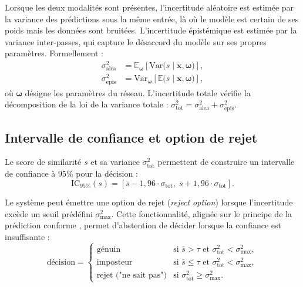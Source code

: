 \documentclass[12pt,a4paper]{report}
\begin{document}
Lorsque les deux modalit\'{e}s sont pr\'{e}sentes, l'incertitude al\'{e}atoire est estim\'{e}e par la variance des pr\'{e}dictions sous la m\^{e}me entr\'{e}e, l\`{a} o\`{u} le mod\`{e}le est certain de ses poids mais les donn\'{e}es sont bruit\'{e}es. L'incertitude \'{e}pist\'{e}mique est estim\'{e}e par la variance inter-passes, qui capture le d\'{e}saccord du mod\`{e}le sur ses propres param\`{e}tres. Formellement :
\begin{align}
\label{eq:decomposition-aleatoric}
\sigma^2_{\text{alea}} &= \mathbb{E}_{\mathbf{\omega}}\left[\text{Var}\bigl(s \mid \mathbf{x}, \mathbf{\omega}\bigr)\right], \\
\label{eq:decomposition-epistemic}
\sigma^2_{\text{epis}} &= \text{Var}_{\mathbf{\omega}}\left[\mathbb{E}\bigl(s \mid \mathbf{x}, \mathbf{\omega}\bigr)\right],
\end{align}
o\`{u} $\mathbf{\omega}$ d\'{e}signe les param\`{e}tres du r\'{e}seau. L'incertitude totale v\'{e}rifie la d\'{e}composition de la loi de la variance totale : $\sigma^2_{\text{tot}} = \sigma^2_{\text{alea}} + \sigma^2_{\text{epis}}$.

\subsection{Intervalle de confiance et option de rejet}

Le score de similarit\'{e} $s$ et sa variance $\sigma^2_{\text{tot}}$ permettent de construire un intervalle de confiance \`{a} $95\%$ pour la d\'{e}cision :
\begin{equation}
\label{eq:intervalle-confiance}
\text{IC}_{95\%}(s) = \left[ \bar{s} - 1{,}96 \cdot \sigma_{\text{tot}}, \; \bar{s} + 1{,}96 \cdot \sigma_{\text{tot}} \right].
\end{equation}

Le syst\`{e}me peut \'{e}mettre une option de rejet (\emph{reject option}) lorsque l'incertitude exc\`{e}de un seuil pr\'{e}d\'{e}fini $\sigma^2_{\max}$. Cette fonctionnalit\'{e}, align\'{e}e sur le principe de la pr\'{e}diction conforme \cite{balomenos2018conformal}, permet d'abstention de d\'{e}cider lorsque la confiance est insuffisante :
\begin{equation}
\label{eq:rejet}
\text{d\'{e}cision} = \begin{cases}
\text{g\'{e}nuin} & \text{si } \bar{s} > \tau \text{ et } \sigma^2_{\text{tot}} < \sigma^2_{\max}, \\
\text{imposteur} & \text{si } \bar{s} \leq \tau \text{ et } \sigma^2_{\text{tot}} < \sigma^2_{\max}, \\
\text{rejet ("ne sait pas")} & \text{si } \sigma^2_{\text{tot}} \geq \sigma^2_{\max}.
\end{cases}
\end{equation}
\end{document}

